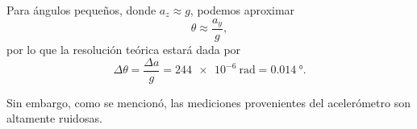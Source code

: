 Para ángulos pequeños, donde $a_z \approx g$, podemos aproximar
$$\theta \approx \frac{a_y}{g},$$
por lo que la resolución teórica estará dada por
$$\Delta \theta = \frac{\Delta a}{g} = \qty{244e-6}{\radian} = \qty{0.014}{\degree}.$$

Sin embargo, como se mencionó, las mediciones provenientes del acelerómetro son altamente ruidosas.


